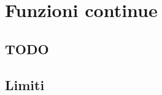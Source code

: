 
\chapter{Funzioni continue}

\section{TODO}
\begin{comment}
 
Schema del capitolo
===================

Limiti
------

Continuità
----------

  C. in un punto
  ''''''''''''''
  
    Definizione
    ...........
  
      Definizioni equivalenti
      
    Punti di discontinuità e di non derivabilità
    ............................................
 
  C. in un intervallo
  '''''''''''''''''''
  
    Definizione
    ...........
  
      Teorema funzioni elementari
      Teorema composizione di funzioni
      
    Insieme e sottoinsiemi delle funzioni
    .....................................
    
Massimi e minimi
----------------

  Definizione
  '''''''''''
  
    Teorema del punto critico
    
  Proprietà delle f. continue
  '''''''''''''''''''''''''''
  
    I numeri iperinteri
    ...................
    
    Teorema degli zeri
    
    Teorema dei valori estremanti
    
    Teorema di Rolle
    
    Teorema di Lagrange
    
    Corollario

\end{comment}


\section{Limiti}
\label{sec:cont_limiti}

